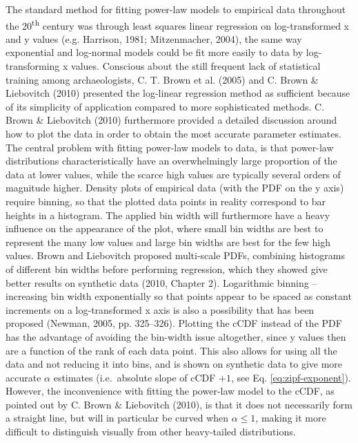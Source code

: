 \documentclass[
  12pt,
]{book}
\begin{document}
The standard method for fitting power-law models to empirical data throughout the 20\textsuperscript{th} century was through least squares linear regression on log-transformed x and y values (e.g. Harrison, 1981; Mitzenmacher, 2004), the same way exponential and log-normal models could be fit more easily to data by log-transforming x values. Conscious about the still frequent lack of statistical training among archaeologists, C. T. Brown et al. (2005) and C. Brown \& Liebovitch (2010) presented the log-linear regression method as sufficient because of its simplicity of application compared to more sophisticated methods. C. Brown \& Liebovitch (2010) furthermore provided a detailed discussion around how to plot the data in order to obtain the most accurate parameter estimates. The central problem with fitting power-law models to data, is that power-law distributions characteristically have an overwhelmingly large proportion of the data at lower values, while the scarce high values are typically several orders of magnitude higher. Density plots of empirical data (with the PDF on the y axis) require binning, so that the plotted data points in reality correspond to bar heights in a histogram. The applied bin width will furthermore have a heavy influence on the appearance of the plot, where small bin widths are best to represent the many low values and large bin widths are best for the few high values. Brown and Liebovitch proposed multi-scale PDFs, combining histograms of different bin widths before performing regression, which they showed give better results on synthetic data (2010, Chapter 2). Logarithmic binning -- increasing bin width exponentially so that points appear to be spaced as constant increments on a log-transformed x axis is also a possibility that has been proposed (Newman, 2005, pp. 325--326). Plotting the cCDF instead of the PDF has the advantage of avoiding the bin-width issue altogether, since y values then are a function of the rank of each data point. This also allows for using all the data and not reducing it into bins, and is shown on synthetic data to give more accurate \(\alpha\) estimates (i.e.~absolute slope of cCDF \(+ 1\), see Eq. \eqref{eq:zipf-exponent}). However, the inconvenience with fitting the power-law model to the cCDF, as pointed out by C. Brown \& Liebovitch (2010), is that it does not necessarily form a straight line, but will in particular be curved when \(\alpha \leq 1\), making it more difficult to distinguish visually from other heavy-tailed distributions.
\end{document}
